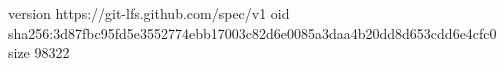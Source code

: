 version https://git-lfs.github.com/spec/v1
oid sha256:3d87fbc95fd5e3552774ebb17003c82d6e0085a3daa4b20dd8d653cdd6e4cfc0
size 98322
